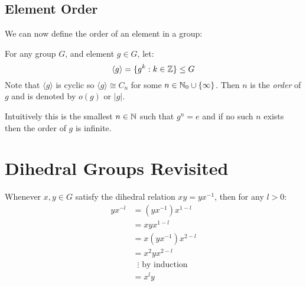 \documentclass[../main.tex]{subfiles}
\begin{document}
\subsection{Element Order}
We can now define the order of an element in a group:
\begin{definition}
  For any group $G$, and element $g \in G$, let:
  \[
    \langle g \rangle = \{g^{k} : k \in \mathbb{Z}\} \leq G
  \]
  Note that $\langle g \rangle$ is cyclic so $\langle g \rangle \cong C_n$ for some $n \in \mathbb{N}_0 \cup \{\infty\}$.
  Then $n$ is the \textit{order} of $g$ and is denoted by $o(g)$ or $|g|$.
\end{definition}
Intuitively this is the smallest $n \in \mathbb{N}$ such that $g^{n} = e$ and if no such $n$ exists then the order of $g$ is infinite.
\section{Dihedral Groups Revisited}
Whenever $x, y \in G$ satisfy the dihedral relation $xy = yx^{-1}$, then for any $l > 0$:
\begin{align*}
  yx^{-l} &= (yx^{-1}) x^{1-l} \\
          &= xyx^{1-l} \\
          &= x(yx^{-1})x^{2-l} \\
          &= x^2yx^{2-l} \\
          &\;\; \vdots \text{ by induction}\\
          &= x^{l}y
\end{align*}
\end{document}
